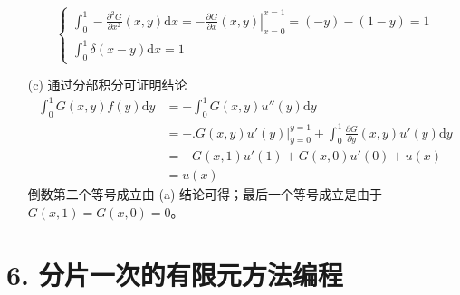 \documentclass[a4paper]{article}
\begin{document}
\begin{enumerate}
\begin{equation}
                \begin{cases}
                    \displaystyle\int_{0}^{1}-\frac{\partial^2 G}{\partial x^2}(x,y)\text{d}x=
                    \left.-\frac{\partial G}{\partial x}(x,y)\right|_{x=0}^{x=1}
                    =(-y)-(1-y)=1\\
                    \displaystyle\int_{0}^{1}\delta(x-y)\text{d}x=1
                \end{cases}
            \end{equation}
        \item[(c)] 通过分部积分可证明结论 
            \begin{equation}
                \begin{aligned}
                    \int_{0}^{1}G(x,y)f(y)\text{d}y
                    &=-\int_{0}^{1}G(x,y)u''(y)\text{d}y\\
                    &=-\Big.G(x,y)u'(y)\Big|_{y=0}^{y=1}
                    +\int_{0}^{1}\frac{\partial G}{\partial y}(x,y)u'(y)\text{d}y\\
                    &=-G(x,1)u'(1)+G(x,0)u'(0) + u(x)\\
                    &=u(x)
                \end{aligned}
            \end{equation}
            倒数第二个等号成立由 (a) 结论可得；最后一个等号成立是由于$G(x,1)=G(x,0)=0$。
\end{enumerate}

\section*{6. 分片一次的有限元方法编程}
\end{document}
